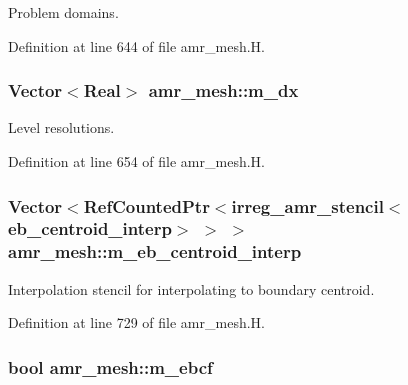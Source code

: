 Problem domains. 



Definition at line 644 of file amr\+\_\+mesh.\+H.

\subsubsection[{\texorpdfstring{m\+\_\+dx}{m_dx}}]{\setlength{\rightskip}{0pt plus 5cm}Vector$<$Real$>$ amr\+\_\+mesh\+::m\+\_\+dx\hspace{0.3cm}{\ttfamily [protected]}}\hypertarget{classamr__mesh_ab361e5fb07b7049a1fc612bd2ceb8705}{}\label{classamr__mesh_ab361e5fb07b7049a1fc612bd2ceb8705}


Level resolutions. 



Definition at line 654 of file amr\+\_\+mesh.\+H.

\subsubsection[{\texorpdfstring{m\+\_\+eb\+\_\+centroid\+\_\+interp}{m_eb_centroid_interp}}]{\setlength{\rightskip}{0pt plus 5cm}Vector$<$Ref\+Counted\+Ptr$<${\bf irreg\+\_\+amr\+\_\+stencil}$<${\bf eb\+\_\+centroid\+\_\+interp}$>$ $>$ $>$ amr\+\_\+mesh\+::m\+\_\+eb\+\_\+centroid\+\_\+interp\hspace{0.3cm}{\ttfamily [protected]}}\hypertarget{classamr__mesh_a09e8d1b645ad96a3d97f0304c3f55ad3}{}\label{classamr__mesh_a09e8d1b645ad96a3d97f0304c3f55ad3}


Interpolation stencil for interpolating to boundary centroid. 



Definition at line 729 of file amr\+\_\+mesh.\+H.

\subsubsection[{\texorpdfstring{m\+\_\+ebcf}{m_ebcf}}]{\setlength{\rightskip}{0pt plus 5cm}bool amr\+\_\+mesh\+::m\+\_\+ebcf\hspace{0.3cm}{\ttfamily [protected]}}\hypertarget{classamr__mesh_ac6108679b364b7e411ca709e1d8dfac9}{}\label{classamr__mesh_ac6108679b364b7e411ca709e1d8dfac9}


